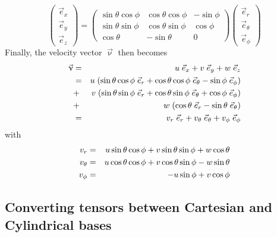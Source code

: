 \[
\left(
\begin{array}{c}
\vec{e}_{x} \\ \vec{e}_y \\ \vec{e}_z
\end{array}
\right)
=
\left(
\begin{array}{ccc}
\sin\theta \cos\phi & \cos\theta\cos\phi & -\sin\phi  \\
\sin\theta \sin\phi & \cos\theta\sin\phi & \cos\phi \\
\cos\theta & -\sin\theta & 0
\end{array}
\right)
\left(
\begin{array}{c}
\vec{e}_{r} \\ \vec{e}_\theta \\ \vec{e}_\phi
\end{array}
\right)
\]
Finally, the velocity vector $\vec{\upnu}$ then becomes
\begin{eqnarray}
\vec{\upnu} 
&=& u\; \vec{e}_x + v \; \vec{e}_y + w \; \vec{e}_z \nonumber\\
&=& u\; ( \sin\theta \cos\phi \; \vec{e}_r +  \cos\theta\cos\phi \;  \vec{e}_{\theta} -\sin\phi \; \vec{e}_{\phi} ) \nonumber\\
&+& v\; ( \sin\theta \sin\phi \; \vec{e}_r + \cos\theta\sin\phi \; \vec{e}_\theta  +  \cos\phi \;  \vec{e}_\phi  )  \nonumber\\
&+& w\; ( \cos\theta \; \vec{e}_r   -\sin\theta \; \vec{e}_\theta  ) \nonumber\\
&=& v_r\; \vec{e}_r + v_\theta\; \vec{e}_\theta + v_\phi\; \vec{e}_\phi 
\end{eqnarray}
with 
\begin{eqnarray}
v_r      &=&  u \sin \theta  \cos \phi  + v \sin\theta \sin \phi + w \cos\theta \nonumber\\
v_\theta &=&  u \cos\theta\cos\phi + v \cos\theta\sin\phi -w \sin\theta   \nonumber\\
v_\phi   &=& -u \sin\phi  + v \cos\phi  
\end{eqnarray}

\subsection{Converting tensors between Cartesian and Cylindrical bases \label{ss:convcartcyl}}


